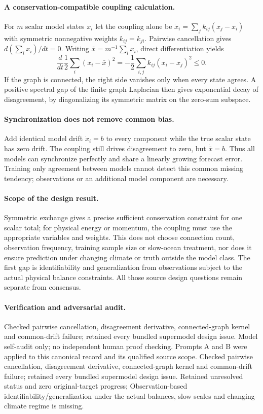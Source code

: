 \documentclass[11pt]{article}
\begin{document}
\paragraph{A conservation-compatible coupling calculation.} For $m$ scalar model states $x_i$ let the coupling alone be $\dot x_i=\sum_jk_{ij}(x_j-x_i)$ with symmetric nonnegative weights $k_{ij}=k_{ji}$. Pairwise cancellation gives $d(\sum_ix_i)/dt=0$. Writing $\bar x=m^{-1}\sum_ix_i$, direct differentiation yields
\[
 \frac d{dt}\frac12\sum_i(x_i-\bar x)^2
 =-\frac12\sum_{i,j}k_{ij}(x_i-x_j)^2\leq0.
\]
If the graph is connected, the right side vanishes only when every state agrees. A positive spectral gap of the finite graph Laplacian then gives exponential decay of disagreement, by diagonalizing its symmetric matrix on the zero-sum subspace.

\paragraph{Synchronization does not remove common bias.} Add identical model drift $\dot x_i=b$ to every component while the true scalar state has zero drift. The coupling still drives disagreement to zero, but $\dot{\bar x}=b$. Thus all models can synchronize perfectly and share a linearly growing forecast error. Training only agreement between models cannot detect this common missing tendency; observations or an additional model component are necessary.

\paragraph{Scope of the design result.} Symmetric exchange gives a precise sufficient conservation constraint for one scalar total; for physical energy or momentum, the coupling must use the appropriate variables and weights. This does not choose connection count, observation frequency, training sample size or slow-ocean treatment, nor does it ensure prediction under changing climate or truth outside the model class. The first gap is identifiability and generalization from observations subject to the actual physical balance constraints. All those source design questions remain separate from consensus.

\paragraph{Verification and adversarial audit.}
Checked pairwise cancellation, disagreement derivative, connected-graph kernel and common-drift failure; retained every bundled supermodel design issue. Model self-audit only; no independent human proof checking. Prompts A and B were applied to this canonical record and its qualified source scope. Checked pairwise cancellation, disagreement derivative, connected-graph kernel and common-drift failure; retained every bundled supermodel design issue. Retained unresolved status and zero original-target progress; Observation-based identifiability/generalization under the actual balances, slow scales and changing-climate regime is missing.
\end{document}
